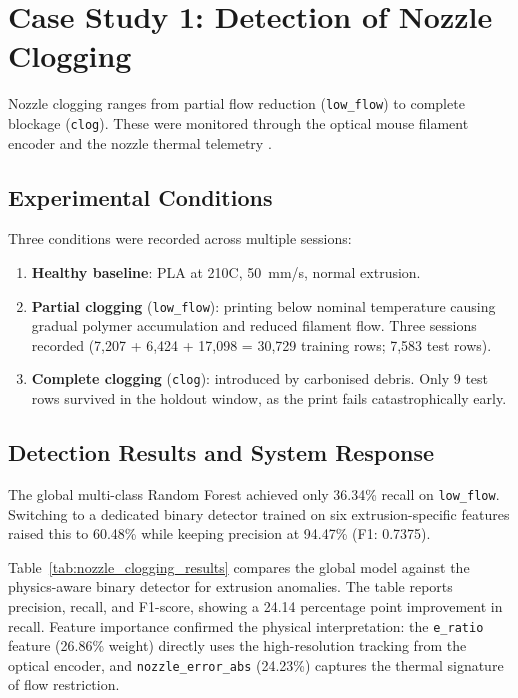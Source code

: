 \section{Case Study 1: Detection of Nozzle Clogging}
\label{sec:cs1}

Nozzle clogging ranges from partial flow reduction (\texttt{low\_flow}) to complete
blockage (\texttt{clog}). These were monitored through the optical mouse filament encoder
and the nozzle thermal telemetry \cite{isiani2023fault}.

\subsection{Experimental Conditions}

Three conditions were recorded across multiple sessions:
\begin{enumerate}
    \item \textbf{Healthy baseline}: PLA at 210\textdegree{}C, 50~mm/s, normal extrusion.
    \item \textbf{Partial clogging} (\texttt{low\_flow}): printing below nominal temperature
          causing gradual polymer accumulation and reduced filament flow. Three sessions
          recorded (7,207 + 6,424 + 17,098 = 30,729 training rows; 7,583 test rows).
    \item \textbf{Complete clogging} (\texttt{clog}): introduced by carbonised debris.
          Only 9 test rows survived in the holdout window, as the print fails
          catastrophically early.
\end{enumerate}

\subsection{Detection Results and System Response}
\label{sec:cs1_results}

The global multi-class Random Forest achieved only 36.34\% recall on \texttt{low\_flow}.
Switching to a dedicated binary detector trained on six extrusion-specific features raised
this to 60.48\% while keeping precision at 94.47\% (F1: 0.7375).

Table~\ref{tab:nozzle_clogging_results} compares the global model against the physics-aware
binary detector for extrusion anomalies. The table reports precision, recall, and F1-score,
showing a 24.14 percentage point improvement in recall. Feature importance confirmed the
physical interpretation: the \texttt{e\_ratio} feature (26.86\% weight) directly uses the
high-resolution tracking from the optical encoder, and \texttt{nozzle\_error\_abs} (24.23\%)
captures the thermal signature of flow restriction.


